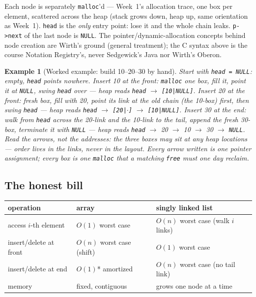 \documentclass[11pt]{article}
\newtheorem{example}{Example}[section]
\begin{document}
Each node is separately \texttt{malloc}'d --- Week~1's allocation trace, one box per element, scattered across the heap (stack grows down, heap up, same orientation as Week~1). \texttt{head} is the \emph{only} entry point: lose it and the whole chain leaks. \texttt{p->next} of the last node is \texttt{NULL}. The pointer/dynamic-allocation concepts behind node creation are Wirth's ground (general treatment); the C syntax above is the course Notation Registry's, never Sedgewick's Java nor Wirth's Oberon.

\begin{example}[Worked example: build 10--20--30 by hand]
Start with \texttt{head = NULL}: empty, \texttt{head} points nowhere. Insert 10 at the front: \texttt{malloc} one box, fill it, point it at \texttt{NULL}, swing \texttt{head} over --- heap reads \texttt{head} $\to$ \texttt{[10|NULL]}. Insert 20 at the front: fresh box, fill with 20, point its link at the old chain (the 10-box) \emph{first}, then swing \texttt{head} --- heap reads \texttt{head} $\to$ \texttt{[20|$\cdot$]} $\to$ \texttt{[10|NULL]}. Insert 30 at the end: walk from \texttt{head} across the 20-link and the 10-link to the tail, append the fresh 30-box, terminate it with \texttt{NULL} --- heap reads \texttt{head} $\to$ 20 $\to$ 10 $\to$ 30 $\to$ \texttt{NULL}. Read the arrows, not the addresses: the three boxes may sit at any heap locations --- order lives in the links, never in the layout. Every arrow written is one pointer assignment; every box is one \texttt{malloc} that a matching \texttt{free} must one day reclaim.
\end{example}

\subsection{The honest bill}

\begin{center}
{\footnotesize
\begin{tabular}{lll}
  \toprule
  \textbf{operation} & \textbf{array} & \textbf{singly linked list} \\
  \midrule
  access $i$-th element & $O(1)$ worst case & $O(n)$ worst case (walk $i$ links) \\
  insert/delete at front & $O(n)$ worst case (shift) & $O(1)$ worst case \\
  insert/delete at end & $O(1)$* amortized & $O(n)$ worst case (no tail link) \\
  memory & fixed, contiguous & grows one node at a time \\
  \bottomrule
\end{tabular}}
\end{center}
\end{document}
